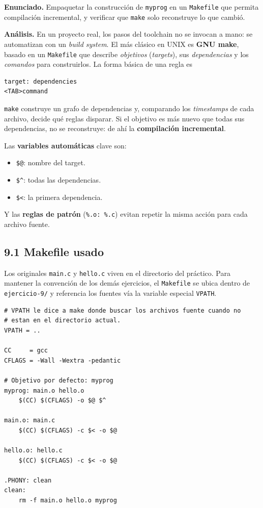 \documentclass[11pt,a4paper]{article}
\begin{document}
\textbf{Enunciado.} Empaquetar la construcción de \texttt{myprog} en
un \texttt{Makefile} que permita compilación incremental, y verificar
que \texttt{make} solo reconstruye lo que cambió.

\textbf{Análisis.} En un proyecto real, los pasos del toolchain no se
invocan a mano: se automatizan con un \emph{build system}. El más
clásico en UNIX es \textbf{GNU make}, basado en un \texttt{Makefile}
que describe \emph{objetivos} (\emph{targets}), sus
\emph{dependencias} y los \emph{comandos} para construirlos. La forma
básica de una regla es

\begin{lstlisting}[style=asmstyle]
target: dependencies
<TAB>command
\end{lstlisting}

\texttt{make} construye un grafo de dependencias y, comparando los
\emph{timestamps} de cada archivo, decide qué reglas disparar. Si el
objetivo es más nuevo que todas sus dependencias, no se reconstruye:
de ahí la \textbf{compilación incremental}.

Las \textbf{variables automáticas} clave son:
\begin{itemize}[leftmargin=*, itemsep=0pt]
    \item \texttt{\$@}: nombre del target.
    \item \texttt{\$\^{}}: todas las dependencias.
    \item \texttt{\$<}: la primera dependencia.
\end{itemize}

Y las \textbf{reglas de patrón} (\texttt{\%.o: \%.c}) evitan repetir
la misma acción para cada archivo fuente.

\subsection*{9.1 Makefile usado}

Los originales \texttt{main.c} y \texttt{hello.c} viven en el directorio
del práctico. Para mantener la convención de los demás ejercicios, el
\texttt{Makefile} se ubica dentro de \texttt{ejercicio-9/} y referencia
los fuentes vía la variable especial \texttt{VPATH}.

\begin{lstlisting}[style=asmstyle]
# VPATH le dice a make donde buscar los archivos fuente cuando no
# estan en el directorio actual.
VPATH = ..

CC     = gcc
CFLAGS = -Wall -Wextra -pedantic

# Objetivo por defecto: myprog
myprog: main.o hello.o
	$(CC) $(CFLAGS) -o $@ $^

main.o: main.c
	$(CC) $(CFLAGS) -c $< -o $@

hello.o: hello.c
	$(CC) $(CFLAGS) -c $< -o $@

.PHONY: clean
clean:
	rm -f main.o hello.o myprog
\end{lstlisting}
\end{document}
